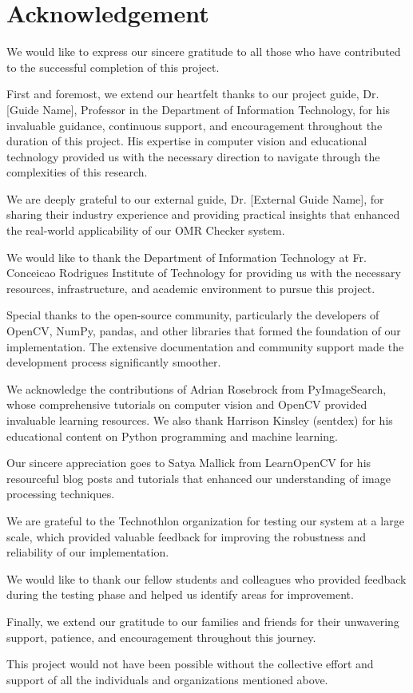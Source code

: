 \chapter*{Acknowledgement}

We would like to express our sincere gratitude to all those who have contributed to the successful completion of this project.

First and foremost, we extend our heartfelt thanks to our project guide, Dr. [Guide Name], Professor in the Department of Information Technology, for his invaluable guidance, continuous support, and encouragement throughout the duration of this project. His expertise in computer vision and educational technology provided us with the necessary direction to navigate through the complexities of this research.

We are deeply grateful to our external guide, Dr. [External Guide Name], for sharing their industry experience and providing practical insights that enhanced the real-world applicability of our OMR Checker system.

We would like to thank the Department of Information Technology at Fr. Conceicao Rodrigues Institute of Technology for providing us with the necessary resources, infrastructure, and academic environment to pursue this project.

Special thanks to the open-source community, particularly the developers of OpenCV, NumPy, pandas, and other libraries that formed the foundation of our implementation. The extensive documentation and community support made the development process significantly smoother.

We acknowledge the contributions of Adrian Rosebrock from PyImageSearch, whose comprehensive tutorials on computer vision and OpenCV provided invaluable learning resources. We also thank Harrison Kinsley (sentdex) for his educational content on Python programming and machine learning.

Our sincere appreciation goes to Satya Mallick from LearnOpenCV for his resourceful blog posts and tutorials that enhanced our understanding of image processing techniques.

We are grateful to the Technothlon organization for testing our system at a large scale, which provided valuable feedback for improving the robustness and reliability of our implementation.

We would like to thank our fellow students and colleagues who provided feedback during the testing phase and helped us identify areas for improvement.

Finally, we extend our gratitude to our families and friends for their unwavering support, patience, and encouragement throughout this journey.

This project would not have been possible without the collective effort and support of all the individuals and organizations mentioned above.
